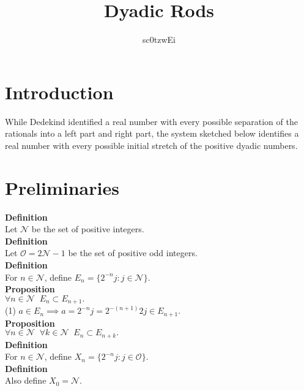 \documentclass{article}
\title{\textbf{Dyadic Rods}}
\author{sc0tzwEi }
\newcommand{\odds}{ \mathscr{O}}
\newcommand{\disjoints}{ X}
\newcommand{\nondisjoints}{E}
\newcommand{\naturals}{ \mathscr{N}}
\newcommand{\elt}{a}
\newcommand{\odds}{ \mathscr{O}}
\begin{document}
\maketitle

\section{Introduction}
While Dedekind identified a real number with every possible separation of the rationals into a left part and right part, the system sketched below identifies a real number with every possible initial stretch of the positive dyadic numbers. \\

\section{Preliminaries}


\textbf{Definition}\\
Let $\naturals $ be the set of positive integers.\\

\textbf{Definition}\\
Let $\odds = 2\naturals - 1 $ be the set of positive odd integers.\\

\textbf{Definition}\\
For $n \in \naturals$, define  $\nondisjoints_n = \{ 2^{-n}j : j \in \naturals \}$. \\

\textbf{Proposition}\\
$\forall n \in \naturals \;\; \nondisjoints_n \subset \nondisjoints_{n+1}.$\\

(1) $\elt \in \nondisjoints_n \implies \elt = 2^{-n}j = 2^{-(n+1)}2j \in \nondisjoints_{n+1}$.\\

\textbf{Proposition}\\
$\forall n \in \naturals \;\; \forall k \in \naturals \;\; \nondisjoints_n \subset \nondisjoints_{n+k}.$\\

\textbf{Definition}\\
For  $n \in \naturals$, define $\disjoints_n = \{2^{-n} j : j \in \odds \}$.\\

\textbf{Definition}\\
Also define $\disjoints_0 = \naturals$.\\
\end{document}
